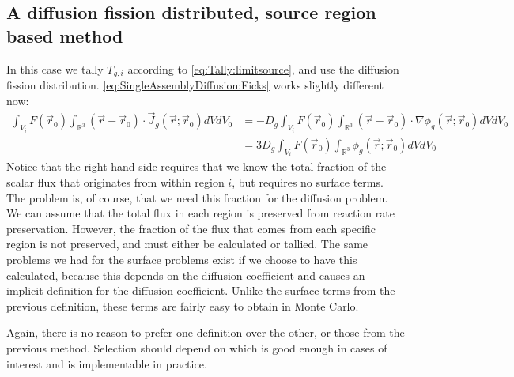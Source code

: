 \documentclass[a4paper,letterpaper,12pt,oneside,draft]{article}
\newcommand{\allspace}{\ensuremath{\mathbb{R}^3}}
\newcommand{\vr}{\ensuremath{\vec{r}}}
\newcommand{\dvr}{\left(\vr-\vr_0\right)}
\begin{document}
\subsection{A diffusion fission distributed, source region based method}
In this case we tally $T_{g,i}$ according to \cref{eq:Tally:limitsource}, and use the diffusion fission distribution. \cref{eq:SingleAssemblyDiffusion:Ficks} works slightly different now:
\begin{align}
    \nonumber
    \int_{V_i} F(\vr_0)\int_{\allspace} \dvr\cdot\vec{J}_g(\vr;\vr_0) dVdV_0 &= -D_g \int_{V_i} F(\vr_0) \int_{\allspace} \dvr\cdot\nabla \phi_g(\vr;\vr_0)dVdV_0 \\
    \label{eq:DiffFissSource}
    &= 3D_g \int_{V_i}F(\vr_0)\int_{\allspace}\phi_g(\vr;\vr_0)dVdV_0 
\end{align}
Notice that the right hand side requires that we know the total fraction of the scalar flux that originates from within region $i$, but requires no surface terms.
The problem is, of course, that we need this fraction for the diffusion problem. 
We can assume that the total flux in each region is preserved from reaction rate preservation. 
However, the fraction of the flux that comes from each specific region is not preserved, and must either be calculated or tallied.
The same problems we had for the surface problems exist if we choose to have this calculated, because this depends on the diffusion coefficient and causes an implicit definition for the diffusion coefficient.
Unlike the surface terms from the previous definition, these terms are fairly easy to obtain in Monte Carlo.

Again, there is no reason to prefer one definition over the other, or those from the previous method.
Selection should depend on which is good enough in cases of interest and is implementable in practice.
\end{document}

